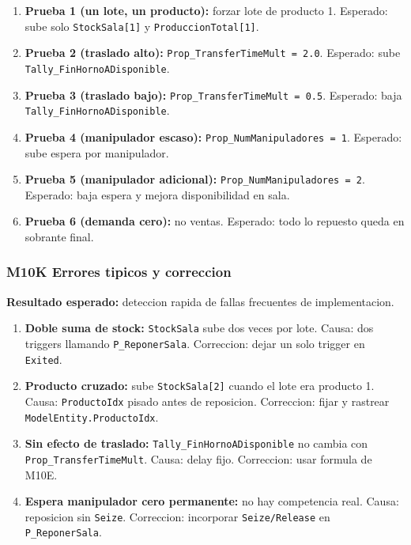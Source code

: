 \documentclass[11pt]{article}
\newcommand{\simio}[1]{\texttt{#1}}
\newcommand{\state}[1]{\texttt{#1}}
\newcommand{\proc}[1]{\texttt{#1}}
\begin{document}
\begin{enumerate}
  \item \textbf{Prueba 1 (un lote, un producto):} forzar lote de producto 1. Esperado: sube solo \state{StockSala[1]} y \state{ProduccionTotal[1]}.
  \item \textbf{Prueba 2 (traslado alto):} \state{Prop\_TransferTimeMult = 2.0}. Esperado: sube \simio{Tally\_FinHornoADisponible}.
  \item \textbf{Prueba 3 (traslado bajo):} \state{Prop\_TransferTimeMult = 0.5}. Esperado: baja \simio{Tally\_FinHornoADisponible}.
  \item \textbf{Prueba 4 (manipulador escaso):} \state{Prop\_NumManipuladores = 1}. Esperado: sube espera por manipulador.
  \item \textbf{Prueba 5 (manipulador adicional):} \state{Prop\_NumManipuladores = 2}. Esperado: baja espera y mejora disponibilidad en sala.
  \item \textbf{Prueba 6 (demanda cero):} no ventas. Esperado: todo lo repuesto queda en sobrante final.
\end{enumerate}

\subsubsection{M10K Errores tipicos y correccion}
\textbf{Resultado esperado:} deteccion rapida de fallas frecuentes de implementacion.

\begin{enumerate}
  \item \textbf{Doble suma de stock:} \state{StockSala} sube dos veces por lote. Causa: dos triggers llamando \proc{P\_ReponerSala}. Correccion: dejar un solo trigger en \simio{Exited}.
  \item \textbf{Producto cruzado:} sube \state{StockSala[2]} cuando el lote era producto 1. Causa: \state{ProductoIdx} pisado antes de reposicion. Correccion: fijar y rastrear \state{ModelEntity.ProductoIdx}.
  \item \textbf{Sin efecto de traslado:} \simio{Tally\_FinHornoADisponible} no cambia con \state{Prop\_TransferTimeMult}. Causa: delay fijo. Correccion: usar formula de M10E.
  \item \textbf{Espera manipulador cero permanente:} no hay competencia real. Causa: reposicion sin \simio{Seize}. Correccion: incorporar \simio{Seize/Release} en \proc{P\_ReponerSala}.
\end{enumerate}
\end{document}
